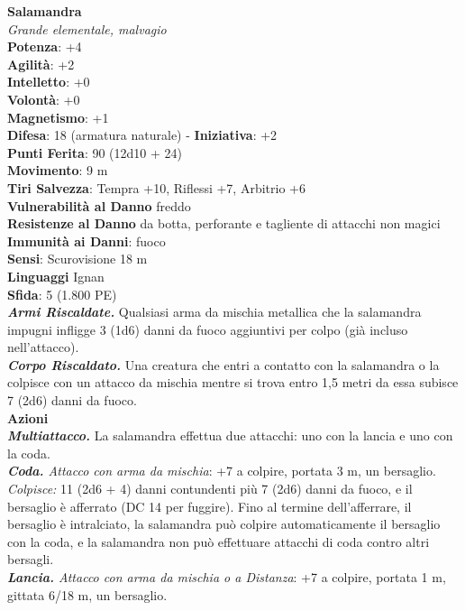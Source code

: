 \begin{multicols}{2}
\medskip\textbf{Salamandra}\\
\emph{Grande elementale, malvagio}\\
\textbf{Potenza}: +4\\
\textbf{Agilità}: +2\\
\textbf{Intelletto}: +0\\
\textbf{Volontà}: +0\\
\textbf{Magnetismo}: +1\\
\textbf{Difesa}: 18 (armatura naturale) - \textbf{Iniziativa}: +2\\
\textbf{Punti Ferita}: 90 (12d10 + 24)\\
\textbf{Movimento}: 9 m\\
\textbf{Tiri Salvezza}: Tempra +10, Riflessi +7, Arbitrio +6\\
\textbf{Vulnerabilità al Danno} freddo\\
\textbf{Resistenze al Danno} da botta, perforante e tagliente di attacchi non magici\\
\textbf{Immunità ai Danni}: fuoco\\
\textbf{Sensi}: Scurovisione 18 m\\
\textbf{Linguaggi} Ignan\\
\textbf{Sfida}: 5 (1.800 PE)\smallskip\\
\emph{\textbf{Armi Riscaldate.}} Qualsiasi arma da mischia metallica che la salamandra impugni infligge 3 (1d6) danni da fuoco aggiuntivi per colpo (già incluso nell'attacco).\\
\emph{\textbf{Corpo Riscaldato.}} Una creatura che entri a contatto con la salamandra o la colpisce con un attacco da mischia mentre si trova entro 1,5 metri da essa subisce 7 (2d6) danni da fuoco.\\
\smallskip\textbf{Azioni}\\
\emph{\textbf{Multiattacco.}} La salamandra effettua due attacchi: uno con la lancia e uno con la coda.\\
\emph{\textbf{Coda.} Attacco con arma da mischia}: +7 a colpire, portata 3 m, un bersaglio.\\
\emph{Colpisce:} 11 (2d6 + 4) danni contundenti più 7 (2d6) danni da fuoco, e il bersaglio è afferrato (DC 14 per fuggire). Fino al termine dell'afferrare, il bersaglio è intralciato, la salamandra può colpire automaticamente il bersaglio con la coda, e la salamandra non può effettuare attacchi di coda contro altri bersagli.\\
\emph{\textbf{Lancia.} Attacco con arma da mischia o a Distanza}: +7 a colpire, portata 1 m, gittata 6/18 m, un bersaglio.\\

\end{multicols}

